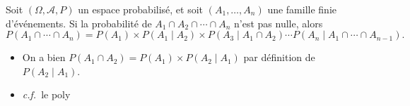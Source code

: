 \begin{thm}
	Soit $(\Omega, \mathcal{A}, P)$\/ un espace probabilisé, et soit $(A_1, \ldots, A_n)$\/ une famille finie d'événements. Si la probabilité de $A_1 \cap A_2 \cap \cdots \cap A_n$\/ n'est pas nulle, alors \[
		P(A_1 \cap \cdots \cap A_n) = P(A_1) \times P(A_1 \mid A_2) \times P(A_3  \mid A_1 \cap A_2) \cdots  P(A_n  \mid A_1 \cap \cdots \cap A_{n-1})
	.\]
\end{thm}

\begin{prv}
	\begin{itemize}
		\item On a bien $P(A_1 \cap A_2) = P(A_1) \times P(A_2  \mid A_1)$\/ par définition de $P(A_2  \mid A_1)$.
		\item \textit{c.f.}\ le poly
	\end{itemize}
\end{prv}
